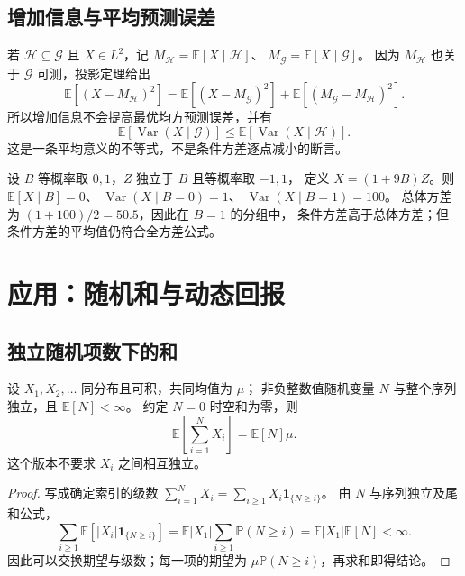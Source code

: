 \documentclass[UTF8]{ctexart}
\begin{document}
\subsection{增加信息与平均预测误差}

若 $\mathcal H\subseteq\mathcal G$ 且 $X\in L^2$，记
$M_{\mathcal H}=\mathbb E[X\mid\mathcal H]$、
$M_{\mathcal G}=\mathbb E[X\mid\mathcal G]$。
因为 $M_{\mathcal H}$ 也关于 $\mathcal G$ 可测，投影定理给出
\[
  \mathbb E[(X-M_{\mathcal H})^2]
  =\mathbb E[(X-M_{\mathcal G})^2]
   +\mathbb E[(M_{\mathcal G}-M_{\mathcal H})^2].
\]
所以增加信息不会提高最优均方预测误差，并有
\[
  \mathbb E[\operatorname{Var}(X\mid\mathcal G)]
  \leq\mathbb E[\operatorname{Var}(X\mid\mathcal H)].
\]
这是一条平均意义的不等式，不是条件方差逐点减小的断言。

\begin{example}[某个分组的条件方差可以更大]
\label{ex:conditional-variance-increase}
设 $B$ 等概率取 $0,1$，$Z$ 独立于 $B$ 且等概率取 $-1,1$，
定义 $X=(1+9B)Z$。则
$\mathbb E[X\mid B]=0$、
$\operatorname{Var}(X\mid B=0)=1$、
$\operatorname{Var}(X\mid B=1)=100$。
总体方差为 $(1+100)/2=50.5$，因此在 $B=1$ 的分组中，
条件方差高于总体方差；但条件方差的平均值仍符合全方差公式。
\end{example}

\section{应用：随机和与动态回报}
\label{sec:expectation-applications}

\subsection{独立随机项数下的和}

\begin{proposition}[独立随机和的期望]
\label{prop:expectation-random-sum}
设 $X_1,X_2,\ldots$ 同分布且可积，共同均值为 $\mu$；
非负整数值随机变量 $N$ 与整个序列独立，且 $\mathbb E[N]<\infty$。
约定 $N=0$ 时空和为零，则
\begin{equation}
  \mathbb E\!\left[\sum_{i=1}^{N}X_i\right]
  =\mathbb E[N]\mu.
  \label{eq:expectation-random-sum}
\end{equation}
这个版本不要求 $X_i$ 之间相互独立。
\end{proposition}

\begin{proof}
写成确定索引的级数
$\sum_{i=1}^{N}X_i=\sum_{i\geq1}X_i\mathbf1_{\{N\geq i\}}$。
由 $N$ 与序列独立及尾和公式，
\[
  \sum_{i\geq1}\mathbb E[|X_i|\mathbf1_{\{N\geq i\}}]
  =\mathbb E|X_1|\sum_{i\geq1}\mathbb P(N\geq i)
  =\mathbb E|X_1|\mathbb E[N]<\infty.
\]
因此可以交换期望与级数；每一项的期望为
$\mu\mathbb P(N\geq i)$，再求和即得结论。
\end{proof}
\end{document}
